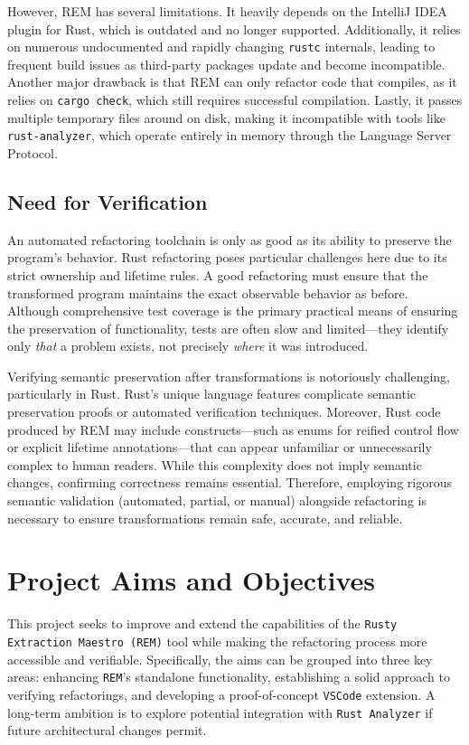 However, REM has several limitations. It heavily depends on the IntelliJ IDEA
plugin for Rust, which is outdated and no longer supported. Additionally, it
relies on numerous undocumented and rapidly changing \texttt{rustc} internals,
leading to frequent build issues as third-party packages update and become
incompatible. Another major drawback is that REM can only refactor code that
compiles, as it relies on \texttt{cargo check}, which still requires successful
compilation. Lastly, it passes multiple temporary files around on disk, making
it incompatible with tools like \texttt{rust-analyzer}, which operate entirely
in memory through the Language Server Protocol.

\subsection{Need for Verification}
\label{sec:need-verification}

An automated refactoring toolchain is only as good as its ability to preserve
the program's behavior. Rust refactoring poses particular challenges here due to
its strict ownership and lifetime rules. A good refactoring must ensure that the
transformed program maintains the exact observable behavior as before. Although
comprehensive test coverage is the primary practical means of ensuring the
preservation of functionality, tests are often slow and limited—they identify
only \textit{that} a problem exists, not precisely \textit{where} it was
introduced.

Verifying semantic preservation after transformations is notoriously
challenging, particularly in Rust. Rust's unique language features complicate
semantic preservation proofs or automated verification techniques. Moreover,
Rust code produced by REM may include constructs—such as enums for reified
control flow or explicit lifetime annotations—that can appear unfamiliar or
unnecessarily complex to human readers. While this complexity does not imply
semantic changes, confirming correctness remains essential. Therefore, employing
rigorous semantic validation (automated, partial, or manual) alongside
refactoring is necessary to ensure transformations remain safe, accurate, and
reliable.

\section{Project Aims and Objectives}
\label{sec:project-aims}

This project seeks to improve and extend the capabilities of the \texttt{Rusty
Extraction Maestro (REM)} tool while making the refactoring process more
accessible and verifiable. Specifically, the aims can be grouped into three key
areas: enhancing \texttt{REM}’s standalone functionality, establishing a solid
approach to verifying refactorings, and developing a proof-of-concept
\texttt{VSCode} extension. A long-term ambition is to explore potential
integration with \texttt{Rust Analyzer} if future architectural changes permit.

